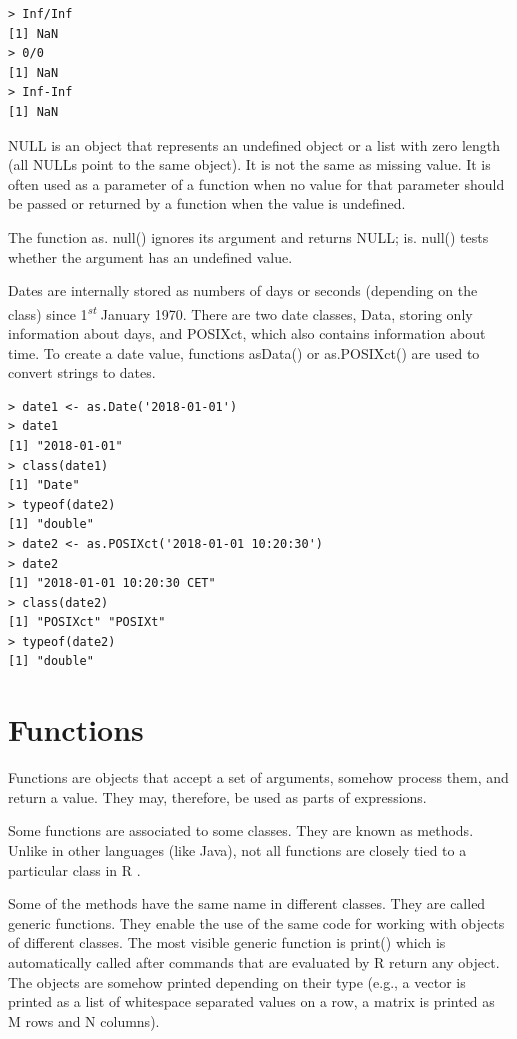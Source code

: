 \documentclass[11pt,openany,executivepaper]{book}
\begin{document}
\begin{verbatim}
> Inf/Inf
[1] NaN
> 0/0
[1] NaN
> Inf-Inf
[1] NaN
\end{verbatim}

NULL is an object that represents an undefined object or a list with zero length (all NULLs point to the same object). It is not the same as missing value. It is often used as a parameter of a function when no value for that parameter should be passed or returned by a function when the value is undefined.

The function as. null() ignores its argument and returns NULL; is. null() tests whether the argument has an undefined value.

Dates are internally stored as numbers of days or seconds (depending on the class) since 1\textsuperscript{\textit{st}} January 1970. There are two date classes, Data, storing only information about days, and POSIXct, which also contains information about time. To create a date value, functions asData() or as.POSIXct() are used to convert strings to dates.

\begin{verbatim}
> date1 <- as.Date('2018-01-01')
> date1
[1] "2018-01-01"
> class(date1)
[1] "Date"
> typeof(date2)
[1] "double"
> date2 <- as.POSIXct('2018-01-01 10:20:30')
> date2
[1] "2018-01-01 10:20:30 CET"
> class(date2)
[1] "POSIXct" "POSIXt"
> typeof(date2)
[1] "double"
\end{verbatim}

\section{Functions}
Functions are objects that accept a set of arguments, somehow process them, and return a value. They may, therefore, be used as parts of expressions.

Some functions are associated to some classes. They are known as methods. Unlike in other languages (like Java), not all functions are closely tied to a particular class in R \cite{4}.

Some of the methods have the same name in different classes. They are called generic functions. They enable the use of the same code for working with objects of different classes. The most visible generic function is print() which is automatically called after commands that are evaluated by R return any object. The objects are somehow printed depending on their type (e.g., a vector is printed as a list of whitespace separated values on a row, a matrix is printed as M rows and N columns).
\end{document}
